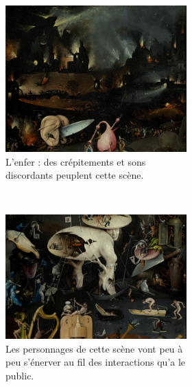 \begin{landscape}
\begin{figure}
\begin{subfigure}[t]{0.3\textwidth}
\begin{subfigure}[t]{\textwidth}
            \includegraphics[width=\textwidth]{images/C1.png}
            \caption{L'enfer : des crépitements et sons discordants peuplent cette scène.}
            \label{fig.c1}
        \end{subfigure}~\\
        \begin{subfigure}[t]{\textwidth}\vskip 0pt
            \centering
            \includegraphics[width=\textwidth]{images/C2.png}
            \caption{Les personnages de cette scène vont peu à peu s'énerver au fil des interactions qu'a le public.}
            \label{fig.c2}
        \end{subfigure}~\\
        \begin{subfigure}[t]{\textwidth}\vskip 0pt

\end{subfigure}
\end{subfigure}
\end{figure}
\end{landscape}
